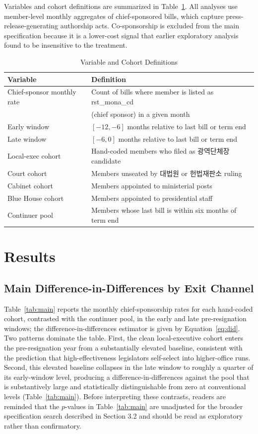 \documentclass[11pt]{article}
\begin{document}
Variables and cohort definitions are summarized in Table~\ref{tab:vars}. All analyses use member-level monthly aggregates of chief-sponsored bills, which capture press-release-generating authorship acts. Co-sponsorship is excluded from the main specification because it is a lower-cost signal that earlier exploratory analysis found to be insensitive to the treatment.

\begin{table}[H]
\centering
\caption{Variable and Cohort Definitions}
\label{tab:vars}
\begin{tabular}{ll}
\toprule
Variable & Definition \\
\midrule
Chief-sponsor monthly rate & Count of bills where member is listed as rst\_mona\_cd \\
 & (chief sponsor) in a given month \\
Early window & $[-12, -6]$ months relative to last bill or term end \\
Late window & $[-6, 0]$ months relative to last bill or term end \\
Local-exec cohort & Hand-coded members who filed as 광역단체장 candidate \\
Court cohort & Members unseated by 대법원 or 헌법재판소 ruling \\
Cabinet cohort & Members appointed to ministerial posts \\
Blue House cohort & Members appointed to presidential staff \\
Continuer pool & Members whose last bill is within six months of term end \\
\bottomrule
\end{tabular}
\end{table}

\section{Results}

\subsection{Main Difference-in-Differences by Exit Channel}

Table~\ref{tab:main} reports the monthly chief-sponsorship rates for each hand-coded cohort, contrasted with the continuer pool, in the early and late pre-resignation windows; the difference-in-differences estimator is given by Equation~\eqref{eq:did}. Two patterns dominate the table. First, the clean local-executive cohort enters the pre-resignation year from a substantially elevated baseline, consistent with the \citet{volden2024} prediction that high-effectiveness legislators self-select into higher-office runs. Second, this elevated baseline collapses in the late window to roughly a quarter of its early-window level, producing a difference-in-differences against the pool that is substantively large and statistically distinguishable from zero at conventional levels (Table~\ref{tab:main}). Before interpreting these contrasts, readers are reminded that the $p$-values in Table~\ref{tab:main} are unadjusted for the broader specification search described in Section 3.2 and should be read as exploratory rather than confirmatory.
\end{document}
